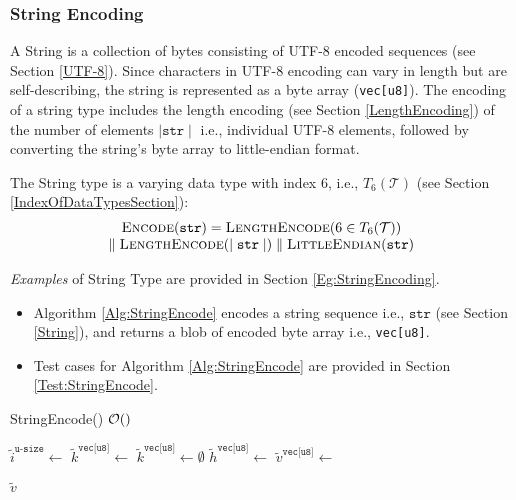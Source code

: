 \documentclass[../alan-handbook.tex]{subfiles}
\begin{document}
\subsubsection{String Encoding} 
\label{StringEncoding}

A String is a collection of bytes consisting of UTF-8 encoded sequences (see Section \ref{UTF-8}). Since characters in UTF-8 encoding can vary in length but are self-describing, the string is represented as a byte array (\texttt{vec[u8]}). The encoding of a string type includes the length encoding (see Section \ref{LengthEncoding}) of the number of elements $\mid \texttt{str} \mid$ i.e., individual UTF-8 elements, followed by converting the string's byte array to little-endian format.

The String type is a varying data type with index $6$, i.e., $T_6(\mathcal{T})$ (see Section \ref{IndexOfDataTypesSection}):
$$
\begin{matrix}
    \Call{Encode}{\texttt{str}} = \Call{LengthEncode}{6 \in T_6(\mathcal{T})} \\
    \parallel \Call{LengthEncode}{\mid \texttt{str} \mid} \parallel \Call{LittleEndian}{\texttt{str}}
\end{matrix}
$$

\textit{Examples} of String Type are provided in Section \ref{Eg:StringEncoding}.

 \label{StringEncode}

\begin{itemize}
    \item Algorithm \ref{Alg:StringEncode} encodes a string sequence i.e., $\texttt{str}$ (see Section \ref{String}), and returns a blob of encoded byte array i.e., \texttt{vec[u8]}.  
    \item Test cases for Algorithm \ref{Alg:StringEncode} are provided in Section \ref{Test:StringEncode}.
\end{itemize}

\begin{algorithm}
\caption{StringEncode() \hfill $\mathcal{O}()$}
\label{Alg:StringEncode}
\begin{algorithmic}
    \State $\tilde{i}^{\texttt{u-size}} \gets$  \Comment{\ref{NumElements}} %
        \State $\tilde{k}^{\texttt{vec[u8]}} \gets$  \Comment{\ref{LeByteArray}}
    \Else 
        \State $\tilde{k}^{\texttt{vec[u8]}} \gets \emptyset$
    \EndIf 
    \State $\tilde{h}^{\texttt{vec[u8]}} \gets$  \Comment{\ref{LengthEncode}} 
    \State $\tilde{v}^{\texttt{vec[u8]}} \gets$  \Comment{\ref{ConcatByteArrays}}

    \Return $\tilde{v}$
\EndFunction
\end{algorithmic}
\end{algorithm}
\end{document}
